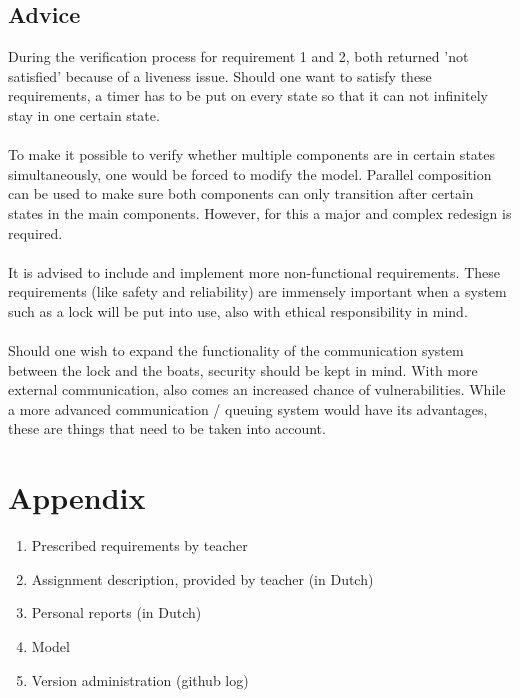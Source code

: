 \documentclass{article}
\begin{document}
    \subsection{Advice}
        During the verification process for requirement 1 and 2, both returned 'not satisfied' because of a liveness issue. Should one want to satisfy these requirements, a timer has to be put on every state so that it can not infinitely stay in one certain state.\\\\
        To make it possible to verify whether multiple components are in certain states simultaneously, one would be forced to modify the model. Parallel composition can be used to make sure both components can only transition after certain states in the main components. However, for this a major and complex redesign is required. \\\\ 
        It is advised to include and implement more non-functional requirements. These requirements (like safety and reliability) are immensely important when a system such as a lock will be put into use, also with ethical responsibility in mind. \\\\
        Should one wish to expand the functionality of the communication system between the lock and the boats, security should be kept in mind. With more external communication, also comes an increased chance of vulnerabilities. While a more advanced communication / queuing system would have its advantages, these are things that need to be taken into account. 
    

\newpage



\newpage

\section{Appendix}
\begin{enumerate}[label=\Roman*.]
    \item Prescribed requirements by teacher
    \item Assignment description, provided by teacher (in Dutch)
    \item Personal reports (in Dutch)
    \item Model
    \item Version administration (github log)
\end{enumerate}
\end{document}

